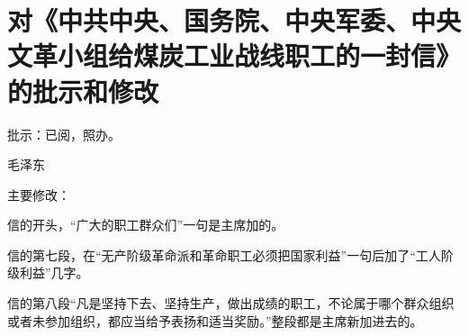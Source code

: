 \section[对《中共中央、国务院、中央军委、中央文革小组给煤炭工业战线职工的一封信》的批示和修改（一九六七年八月十六日）]{对《中共中央、国务院、中央军委、中央文革小组给煤炭工业战线职工的一封信》的批示和修改}


批示：已阅，照办。

{\raggedleft 毛泽东\par}

主要修改：

信的开头，“广大的职工群众们”一句是主席加的。

信的第七段，在“无产阶级革命派和革命职工必须把国家利益”一句后加了“工人阶级利益”几字。

信的第八段“凡是坚持下去、坚持生产，做出成绩的职工，不论属于哪个群众组织或者未参加组织，都应当给予表扬和适当奖励。”整段都是主席新加进去的。


